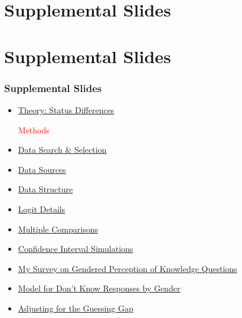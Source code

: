 \documentclass[pdf]{beamer}
\begin{document}
\section{Supplemental Slides}

\section{Supplemental Slides}
\appendix


\begin{frame}
\frametitle{Supplemental Slides}
\label{supplemental_slides}

  \begin{itemize}
    \item
      \footnotesize{\hyperlink{status_differences}{Theory: Status Differences}}

\hspace*{-.75cm}\textcolor{red}{Methods}
    \item
      \footnotesize{\hyperlink{data_search_selection}{Data Search \& Selection}}
    \item
      \footnotesize{\hyperlink{data_sources}{Data Sources}}
    \item
      \footnotesize{\hyperlink{data_structure}{Data Structure}}

    \item
      \footnotesize{\hyperlink{logit_details}{Logit Details}}
    \item
      \footnotesize{\hyperlink{multiple_comparisons}{Multiple Comparisons}}
    \item
      \footnotesize{\hyperlink{ci_simulations}{Confidence Interval Simulations}}
    \item
      \footnotesize{\hyperlink{my_survey}{My Survey on Gendered Perception of Knowledge Questions}}
    \item
      \footnotesize{\hyperlink{dontknow_model}{Model for Don't Know Responses by Gender}}
    \item
      \footnotesize{\hyperlink{guessing_gap_adjustment}{Adjusting for the Guessing Gap}}


\end{itemize}
\end{frame}
\end{document}
